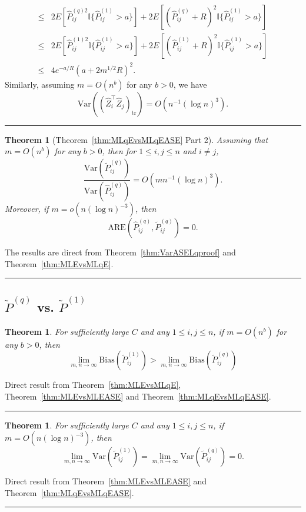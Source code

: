 \documentclass[a4paper]{article}
\newenvironment{proof}{{\bf Proof:  }}{\hfill\rule{2mm}{2mm}}
\newtheorem{theorem}[fact]{Theorem}
\renewcommand{\hat}{\widehat}
\begin{document}
\begin{proof}
\begin{align*}
	\le & 2 E[\hat{P}^{(q)2}_{ij} \mathbb{I}\{\hat{P}^{(1)}_{ij} > a\}] + 2 E[(\hat{P}^{(q)}_{ij} + R)^2 \mathbb{I}\{\hat{P}^{(1)}_{ij} > a\}] \\
	\le & 2 E[\hat{P}^{(1)2}_{ij} \mathbb{I}\{\hat{P}^{(1)}_{ij} > a\}] + 2 E[(\hat{P}^{(1)}_{ij} + R)^2 \mathbb{I}\{\hat{P}^{(1)}_{ij} > a\}] \\
	\le & 4 e^{-a/R} (a + 2 m^{1/2} R)^2.
\end{align*}
Similarly, assuming $m = O(n^b)$ for any $b > 0$, we have
\[
	\mathrm{Var}((\hat{Z}_i^{\top} \hat{Z}_j)_{\mathrm{tr}})
	= O(n^{-1} (\log n)^3).
\]
\end{proof}

\begin{theorem}[Theorem~\ref{thm:MLqEvsMLqEASE} Part 2]
\label{thm:ARELqproof}
Assuming that $m = O(n^b)$ for any $b > 0$,  then for $1 \le i, j \le n$ and $i \ne j$,
\[
	\frac{\mathrm{Var}(\widetilde{P}_{ij}^{(q)})}{\mathrm{Var}(\hat{P}_{ij}^{(q)})}
    = O(m n^{-1} (\log n)^3).
\]
Moreover, if $m = o(n (\log n)^{-3})$, then
\[
	\mathrm{ARE}(\hat{P}_{ij}^{(q)}, \widetilde{P}_{ij}^{(q)}) = 0.
\]
\end{theorem}
\begin{proof}
The results are direct from Theorem~\ref{thm:VarASELqproof} and Theorem~\ref{thm:MLEvsMLqE}.
\end{proof}


\subsection{$\widetilde{P}^{(q)}$ vs. $\widetilde{P}^{(1)}$}
\label{section:MLqEASEvsMLEASE}
\begin{theorem}
\label{thm:biasL1andLq}
For sufficiently large $C$ and any $1 \le i,j \le n$, if $m = O(n^b)$ for any $b > 0$, then
\[
	\lim_{m, n \to \infty} \mathrm{Bias}(\widetilde{P}_{ij}^{(1)})
    > \lim_{m, n \to \infty} \mathrm{Bias}(\widetilde{P}_{ij}^{(q)})
\]
\end{theorem}
\begin{proof}
Direct result from Theorem~\ref{thm:MLEvsMLqE}, Theorem~\ref{thm:MLEvsMLEASE} and Theorem~\ref{thm:MLqEvsMLqEASE}.
\end{proof}

\begin{theorem}
\label{thm:varianceL1andLq}
For sufficiently large $C$ and any $1 \le i,j \le n$, if $m = O(n (\log n)^{-3})$, then
\[
	\lim_{m, n \to \infty} \mathrm{Var}(\widetilde{P}_{ij}^{(1)})
    = \lim_{m, n \to \infty} \mathrm{Var}(\widetilde{P}_{ij}^{(q)}) = 0.
\]
\end{theorem}
\begin{proof}
Direct result from Theorem~\ref{thm:MLEvsMLEASE} and Theorem~\ref{thm:MLqEvsMLqEASE}.
\end{proof}
\end{document}
